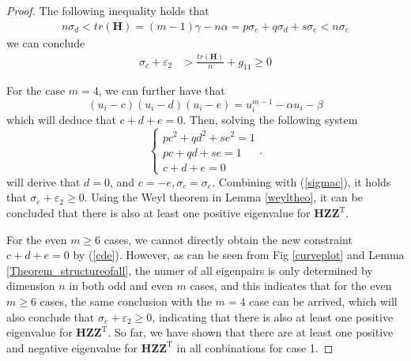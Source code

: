 \begin{proof}
The  following  inequality  holds that  
  \begin{align}
 n  \sigma_{d}    <  tr(\mathbf H)=
 (m-1) \gamma
 -
 n  \alpha  
 =
 {p} \sigma_{c} + 
 {q} \sigma_{d} + 
 {s} \sigma_{e} 
 < 
 n  \sigma_{e} 
 \end{align} 
we can  conclude 
 \begin{align}\label{sigmac}
\sigma_{c}  + 
\varepsilon_{2}
&
>
\frac{tr(\mathbf H)}{n}
+g_{11}
\ge 0
\end{align} 


For  the  case  $m=4$,  we can further  have that 
\begin{equation}\label{cde}
(u_{i}-c)
(u_{i}-d)
(u_{i}-e)
=
u_{i}^{m-1} -\alpha u_{i} - \beta 
\end{equation}
which will  deduce that 
$ c+d+e=0$.
Then,  
solving the  following system  
\begin{equation}\label{ab_expreessfor3}
\begin{cases}
pc^{2}+q d^{2} +s e^{2} =1 \\
pc+q d +s e =1\\
c+d+e=0
\end{cases}. 
\end{equation}
will  derive  that 
$  
d=0$,
 and 
 $ 
 c= -e,  \sigma_{c} =  \sigma_{e}
 $. 
Combining  
with (\ref{sigmac}),  it holds that 
$\sigma_{e}  + 
\varepsilon_{2} \ge   0$.
 Using  the Weyl  theorem  in  Lemma  \ref{weyltheo},
 it can be concluded that 
 there is also  at  least  one  positive  eigenvalue
 for 
 $
 \mathbf H
 \mathbf Z
 \mathbf Z^{\mathrm T} 
 $.
 
 
 For the even $m\ge 6$ cases, we cannot directly   obtain 
 the  new  constraint 
 $ c+d+e=0$ by (\ref{cde}).
 However, 
 as can be seen from 
 Fig 	\ref{curveplot}
 and 
 Lemma  \ref{Theorem_structureofall},
 the numer of all eigenpairs 
 is only determined by 
 dimension $n$
 in both odd and  even $m$  cases, 
 and 
 this indicates that 
for the even $m\ge 6$ cases, 
the same conclusion with the $m=4$ 
case can be arrived, which will also
 conclude that 
 $\sigma_{e}  + 
 \varepsilon_{2} \ge   0$,
 indicating that 
  there is also  at  least  one  positive  eigenvalue
 for 
 $
 \mathbf H
 \mathbf Z
 \mathbf Z^{\mathrm T} 
 $.
 So far, we have shown that 
 there are at  least one positive and negative eigenvalue
 for 
  $
 \mathbf H
 \mathbf Z
 \mathbf Z^{\mathrm T} 
 $ 
 in all  conbinations 
 for case 1. 
 

\end{proof}

